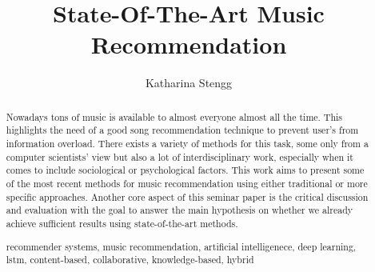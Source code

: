 \documentclass[runningheads,a4paper]{llncs}
\newcommand{\keywords}[1]{\par\addvspace\baselineskip
\noindent\keywordname\enspace\ignorespaces#1}
\begin{document}
\mainmatter  %

\title{State-Of-The-Art Music Recommendation}


%
%
\author{Katharina Stengg}%
%

%
%

\maketitle

\begin{abstract}
  Nowadays tons of music is available to almost everyone almost all the time. 
  This highlights the need of a good song recommendation technique to prevent user’s from information overload. 
  There exists a variety of methods for this task, some only from a computer scientists’ view but also a lot of interdisciplinary work, especially when it comes to include sociological or psychological factors. 
  This work aims to present some of the most recent methods for music recommendation using either traditional or more specific approaches. 
  Another core aspect of this seminar paper is the critical discussion and evaluation with the goal to answer the main hypothesis on whether we already achieve sufficient results using state-of-the-art methods. 
  

\keywords{recommender systems, music recommendation, artificial intelligenece, deep learning, lstm, content-based, collaborative, knowledge-based, hybrid}
\end{abstract}
\end{document}
